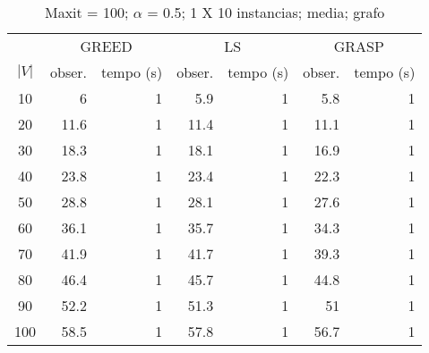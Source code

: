 \documentclass[]{article}
\begin{document}
\begin {table}[h]
\centering
\caption{Maxit = 100; $\alpha$ = 0.5; 1 X 10 instancias; media; grafo}
\begin{small}
	\begin{tabular}{|c|r|r|r|r|r|r|}
		\hline
		& \multicolumn{2}{c|}{GREED} & \multicolumn{2}{c|}{LS} & \multicolumn{2}{c|}{GRASP} \\ 
		\cline{2-7}
		$|V|$   &  obser. & tempo (s)  & obser. & tempo (s) & obser. & tempo (s)\\ 
		\hline
		10 & 6 & 1 & 5.9 & 1 & 5.8 & 1 \\ 
		20 & 11.6 & 1 & 11.4 & 1 & 11.1 & 1 \\ 
		30 & 18.3 & 1 & 18.1 & 1 & 16.9 & 1 \\ 
		40 & 23.8 & 1 & 23.4 & 1 & 22.3 & 1 \\ 
		50 & 28.8 & 1 & 28.1 & 1 & 27.6 & 1 \\ 
		60 & 36.1 & 1 & 35.7 & 1 & 34.3 & 1 \\ 
		70 & 41.9 & 1 & 41.7 & 1 & 39.3 & 1 \\ 
		80 & 46.4 & 1 & 45.7 & 1 & 44.8 & 1 \\ 
		90 & 52.2 & 1 & 51.3 & 1 & 51 & 1 \\ 
		100 & 58.5 & 1 & 57.8 & 1 & 56.7 & 1 \\ 
		\hline
	\end{tabular} \label{}
\end{small}
\end{table}
\end{document}
